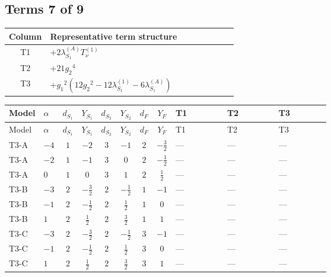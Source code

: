 \documentclass[8pt]{article}
\begin{document}
\begin{landscape}
\subsection*{Terms 7 of 9}
\begin{center}
\begin{tabular}{@{}c >{\raggedright\arraybackslash}p{0.82\linewidth}@{}}
\toprule
Column & Representative term structure \\
\midrule
T1 & \(\displaystyle +2 {\lambda_{S_1}^{(A)}} T_{\nu}^{(1)}\) \\
\midrule
T2 & \(\displaystyle +21 {g_2}^4\) \\
\midrule
T3 & \(\displaystyle +{g_1}^2 \left(12 {g_2}^2-12 {\lambda_{S_1}^{(1)}}-6 {\lambda_{S_1}^{(A)}}\right)\) \\
\midrule
\bottomrule
\end{tabular}
\end{center}
\smallskip
\tiny
\begin{longtable}{@{}llcccccc >{\raggedright\arraybackslash}p{0.21\linewidth} >{\raggedright\arraybackslash}p{0.21\linewidth} >{\raggedright\arraybackslash}p{0.21\linewidth}@{}}
\toprule
Model & $\alpha$ & $d_{S_1}$ & $Y_{S_1}$ & $d_{S_2}$ & $Y_{S_2}$ & $d_F$ & $Y_F$ & T1 & T2 & T3 \\
\midrule
\endfirsthead
\toprule
Model & $\alpha$ & $d_{S_1}$ & $Y_{S_1}$ & $d_{S_2}$ & $Y_{S_2}$ & $d_F$ & $Y_F$ & T1 & T2 & T3 \\
\midrule
\endhead
T3-A & $-4$ & $1$ & $-2$ & $3$ & $-1$ & $2$ & $-\frac{3}{2}$ & --- & --- & --- \\
\midrule
T3-A & $-2$ & $1$ & $-1$ & $3$ & $0$ & $2$ & $-\frac{1}{2}$ & --- & --- & --- \\
\midrule
T3-A & $0$ & $1$ & $0$ & $3$ & $1$ & $2$ & $\frac{1}{2}$ & --- & --- & --- \\
\midrule
T3-B & $-3$ & $2$ & $-\frac{3}{2}$ & $2$ & $-\frac{1}{2}$ & $1$ & $-1$ & --- & --- & --- \\
\midrule
T3-B & $-1$ & $2$ & $-\frac{1}{2}$ & $2$ & $\frac{1}{2}$ & $1$ & $0$ & --- & --- & --- \\
\midrule
T3-B & $1$ & $2$ & $\frac{1}{2}$ & $2$ & $\frac{3}{2}$ & $1$ & $1$ & --- & --- & --- \\
\midrule
T3-C & $-3$ & $2$ & $-\frac{3}{2}$ & $2$ & $-\frac{1}{2}$ & $3$ & $-1$ & --- & --- & --- \\
\midrule
T3-C & $-1$ & $2$ & $-\frac{1}{2}$ & $2$ & $\frac{1}{2}$ & $3$ & $0$ & --- & --- & --- \\
\midrule
T3-C & $1$ & $2$ & $\frac{1}{2}$ & $2$ & $\frac{3}{2}$ & $3$ & $1$ & --- & --- & --- \\

\end{longtable}
\end{landscape}
\end{document}
